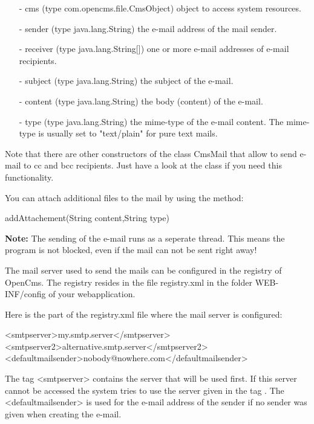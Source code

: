 \begin{itemize}
\item[-] cms (type {\code com.opencms.file.CmsObject}) object to access system resources.
\item[-] sender (type {\code java.lang.String}) the e-mail address of the mail sender.
\item[-] receiver (type {\code java.lang.String[]}) one or more e-mail addresses of e-mail recipients.
\item[-] subject (type {\code java.lang.String}) the subject of the e-mail.
\item[-] content (type {\code java.lang.String}) the body (content) of the e-mail.
\item[-] type (type {\code java.lang.String}) the mime-type of the e-mail content.
The mime-type is usually set to "text/plain" for pure text mails.
\end{itemize}

Note that there are other constructors of the class {\class CmsMail} that allow to send e-mail
to cc and bcc recipients. Just have a look at the class if you need this functionality.

You can attach additional files to the mail by using the method:

{\meth  addAttachement(String content,String type)} 

{\bf Note:} The sending of the e-mail runs as a seperate thread. This means the program is not
blocked, even if the mail can not be sent right away!

The mail server used to send the mails can be configured in the registry of OpenCms.
The registry resides in the file {\name registry.xml} in the folder {\dir WEB-INF/config}
of your webapplication.

Here is the part of the {\name registry.xml} file where the mail server is configured:

\begin{xml}
<smtpserver>my.smtp.server</smtpserver>
<smtpserver2>alternative.smtp.server</smtpserver2>
<defaultmailsender>nobody@nowhere.com</defaultmailsender>
\end{xml}

The tag {\code <smtpserver>} contains the server that will be used first.
If this server cannot be accessed the system tries to use the server given in the tag
{}.
The {\code <defaultmailsender>} is used for the e-mail address of the sender
if no sender was given when creating the e-mail.


